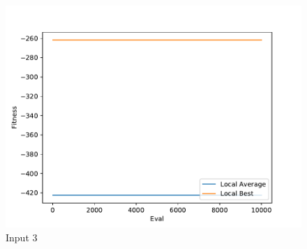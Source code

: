 \documentclass{standalone}
\begin{document}
\begin{figure}[!htb]
	\caption{Input 3}
	\label{fig:graph_3028}
	\includegraphics[width=\textwidth]{../graphs/graphs/3028.pdf}
\end{figure}
\end{document}

